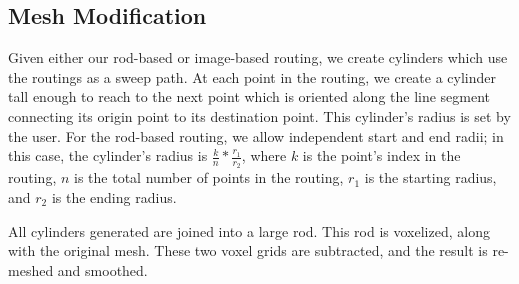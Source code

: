 
\subsection{Mesh Modification}

Given either our rod-based or image-based routing, we create cylinders which use the routings as a sweep path.  At each point in the routing, we create a cylinder tall enough to reach to the next point which is oriented along the line segment connecting its origin point to its destination point.  This cylinder's radius is set by the user.  For the rod-based routing, we allow independent start and end radii; in this case, the cylinder's radius is $\frac{k}{n}*\frac{r_1}{r_2}$, where $k$ is the point's index in the routing, $n$ is the total number of points in the routing, $r_1$ is the starting radius, and $r_2$ is the ending radius.

All cylinders generated are joined into a large rod.  This rod is voxelized, along with the original mesh.  These two voxel grids are subtracted, and the result is re-meshed and smoothed.
